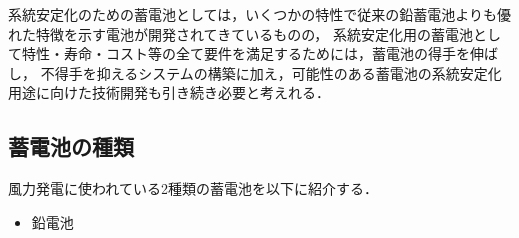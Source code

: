 \documentclass[a4paper,12pt,showkeys]{jreport}
\begin{document}
系統安定化のための蓄電池としては，いくつかの特性で従来の鉛蓄電池よりも優れた特徴を示す電池が開発されてきているものの，
系統安定化用の蓄電池として特性・寿命・コスト等の全て要件を満足するためには，蓄電池の得手を伸ばし，
不得手を抑えるシステムの構築に加え，可能性のある蓄電池の系統安定化用途に向けた技術開発も引き続き必要と考えれる\cite{蓄電池}．

\subsection{蓄電池の種類}

風力発電に使われている2種類の蓄電池を以下に紹介する．

\begin{itemize}
\item 鉛電池
\end{itemize}
\end{document}

